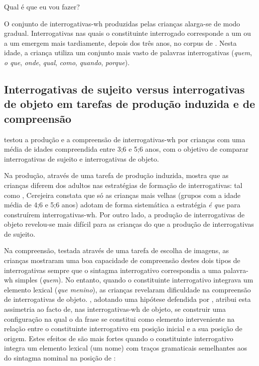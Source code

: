 \documentclass[output=paper]{LSP/langsci}
\begin{document}
\ea\label{ex:lobo_42} Qual é que eu vou fazer?\z

O conjunto de interrogativas-wh produzidas pelas crianças alarga-se de modo gradual. Interrogativas nas quais o constituinte interrogado corresponde a um  ou a um   emergem mais tardiamente, depois dos três anos, no corpus de \citet{soares2006}. Nesta idade, a criança utiliza um conjunto mais vasto de palavras interrogativas (\textit{quem}, \textit{o que}, \textit{onde}, \textit{qual}, \textit{como}, \textit{quando}, \textit{porque}).

\subsection{Interrogativas de sujeito versus interrogativas de objeto em tarefas de produção induzida e de compreensão}
\label{subsec:interrogativas_sujeito}

\citet{cerejeira2009,cerejeira2010} testou a produção e a compreensão de interrogativas-wh por crianças com uma média de idades compreendida entre 3;6 e 5;6 anos, com o objetivo de comparar interrogativas de sujeito e interrogativas de objeto. 

Na produção, através de uma tarefa de produção induzida, \citet{cerejeira2009,cerejeira2010} mostra que as crianças diferem dos adultos nas estratégias de formação de interrogativas: tal como \citet{soares2006}, Cerejeira constata que só as crianças mais velhas (grupos com a idade média de 4;6 e 5;6 anos) adotam de forma sistemática a estratégia \textit{é que} para construírem interrogativas-wh.  Por outro lado, a produção de interrogativas de objeto revelou-se mais difícil para as crianças do que a produção de interrogativas de sujeito.

Na compreensão, testada através de uma tarefa de escolha de imagens, as crianças mostraram uma boa capacidade de compreensão destes dois tipos de interrogativas sempre que o sintagma interrogativo correspondia a uma palavra-wh simples (\textit{quem}). No entanto, quando o constituinte interrogativo integrava um elemento lexical (\textit{que menino}), as crianças revelaram dificuldade na compreensão de interrogativas de objeto. \citet{cerejeira2009,cerejeira2010}, adotando uma hipótese defendida por \citet{friedmann_etal2009}, atribui esta assimetria ao facto de, nas interrogativas-wh de objeto, se construir uma configuração na qual o  da frase se constitui como elemento interveniente na relação entre o constituinte interrogativo em posição inicial e a sua posição de origem. Estes efeitos de  são mais fortes quando o constituinte interrogativo integra um elemento lexical (um nome) com traços gramaticais semelhantes aos do sintagma nominal na posição de :
\end{document}
